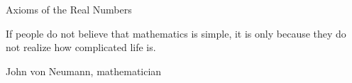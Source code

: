 \begin{section}{Axioms of the Real Numbers}
%
%
%
%
%
%
%
%
%
%
%
%
%

\epigraph{If people do not believe that mathematics is simple, it is only because they do not realize how complicated life is.}{John von Neumann, mathematician}
\end{section}